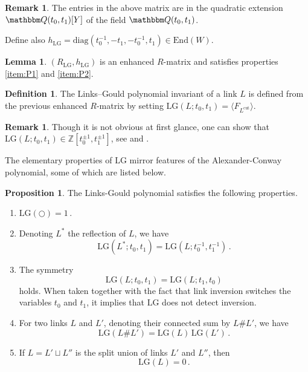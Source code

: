 \documentclass[12pt,reqno]{amsart}
\theoremstyle{definition}
\newtheorem{proposition}[theorem]{Proposition}
\newtheorem{lemma}[theorem]{Lemma}
\newtheorem{definition}[theorem]{Definition}
\newtheorem{remark}[theorem]{Remark}
\def\BQ{\mathbbm Q}
\def\la{\langle}
\def\ra{\rangle}
\def\End{\mathrm{End}}
\def\LG{\mathrm{LG}}
\def\diag{\mathrm{diag}}
\def\RT{F}
\begin{document}
\begin{remark}
    The entries in the above matrix are
in the quadratic extension $\BQ(t_0,t_1)[Y]$ of the field $\BQ(t_0,t_1)$. 
\end{remark}

Define also $h_{\LG}  =\diag(t_0^{-1}, -t_1, -t_0^{-1}, t_1) \in \End(W)$.

\begin{lemma}
$(R_{\LG},h_{\LG})$ is an enhanced
$R$-matrix and satisfies properties \eqref{item:P1} and \eqref{item:P2}.
\end{lemma}

\begin{definition}
    The Links--Gould polynomial invariant of a link $L$ is defined from the previous enhanced $R$-matrix by setting 
    $
    \LG(L;t_0,t_1) = \la\RT_{L^{\mathrm{cut}}}\ra.
    $
\end{definition}

\begin{remark}
    Though it is not obvious at first glance, one can show that $\LG(L;t_0,t_1) \in \mathbb{Z}[t_0^{\pm 1} , t_1^{\pm 1}]$, see \cite[Theorem 1]{Ishii} and \cite[Theorem 1]{GHKKST}.
\end{remark}

The elementary properties of $\LG$ mirror features of the Alexander-Conway polynomial, some of which are listed below.

\begin{proposition}
The Links-Gould polynomial satisfies the following properties.
\begin{enumerate}
    \item $\LG(\bigcirc) = 1$\,.
    \item Denoting $L^{*}$ the reflection of $L$, we have
    \[
        \LG(L^{*}; t_{0}, t_{1}) = \LG(L; t_{0}^{-1}, t_{1}^{-1})\,.
    \]
    \item The symmetry
    \[
        \LG(L; t_{0}, t_{1}) = \LG(L; t_{1}, t_{0})
    \]
    holds. When taken together with the fact that link inversion switches the variables $t_0$ and $t_1$, it implies that $\LG$ does not detect inversion.
    \item For two links $L$ and $L'$, denoting their connected sum by $L \# L'$, we have
    \[
        \LG(L \# L') = \LG(L)\, \LG(L')\,.
    \]
    \item If $L = L' \sqcup L''$ is the split union of links $L'$ and $L''$, then
    \[
        \LG(L) = 0\,.
    \]
\end{enumerate}
\end{proposition}
\end{document}

